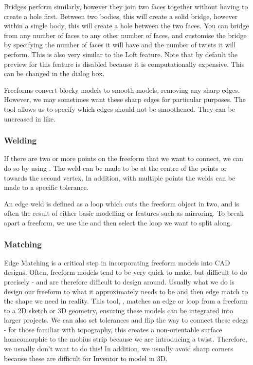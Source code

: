 Bridges perform similarly, however they join two faces together without having to create a hole first. Between two bodies, this will create a solid bridge, however within a single body, this will create a hole between the two faces. You can bridge from any number of faces to any other number of faces, and customise the bridge by specifying the number of faces it will have and the number of twists it will perform. This is also very similar to the Loft feature. Note that by default the preview for this feature is disabled because it is computationally expensive. This can be changed in the dialog box.

Freeforms convert blocky models to smooth models, removing any sharp edges. However, we may sometimes want these sharp edges for particular purposes. The  tool allows us to specify which edges should not be smoothened. They can be uncreased in like.

\subsubsection{Welding}

If there are two or more points on the freeform that we want to connect, we can do so by using . The weld can be made to be at the centre of the points or towards the second vertex. In addition, with multiple points the welds can be made to a specific tolerance. 

An edge weld is defined as a loop which cuts the freeform object in two, and is often the result of either basic modelling or features such as mirroring. To break apart a freeform, we use the  and then select the loop we want to split along. 

\subsubsection{Matching}

Edge Matching is a critical step in incorporating freeform models into CAD designs. Often, freeform models tend to be very quick to make, but difficult to do precisely - and are therefore difficult to design around. Usually what we do is design our freeform to what it approximately needs to be and then edge match to the shape we need in reality. This tool, , matches an edge or loop from a freeform to a 2D sketch or 3D geometry, ensuring these models can be integrated into larger projects. We can also set tolerances and flip the way to connect these edegs - for those familiar with topography, this creates a non-orientable surface homeomorphic to the mobius strip because we are introducing a twist. Therefore, we usually don't want to do this! In addition, we usually avoid sharp corners because these are difficult for Inventor to model in 3D. 

